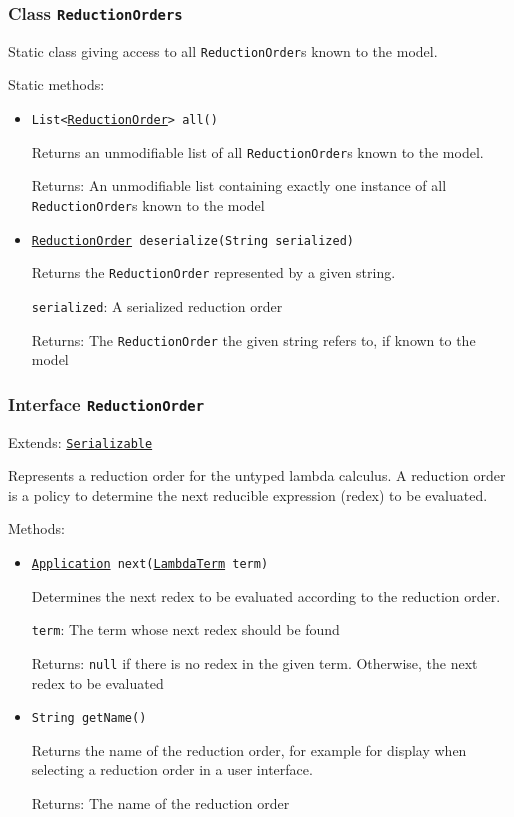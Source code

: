 \subsubsection{Class \texttt{ReductionOrders}}
\label{type:edu.kit.wavelength.client.model.reduction.ReductionOrders}
Static class giving access to all \texttt{ReductionOrder}s known to the model.

Static methods:
\begin{itemize}
\item \texttt{List<\hyperref[type:edu.kit.wavelength.client.model.reduction.ReductionOrder]{ReductionOrder}> all()}

Returns an unmodifiable list of all \texttt{ReductionOrder}s known to the
 model.

Returns: An unmodifiable list containing exactly one instance of all
         \texttt{ReductionOrder}s known to the model

\item \texttt{\hyperref[type:edu.kit.wavelength.client.model.reduction.ReductionOrder]{ReductionOrder} deserialize(String serialized)}

Returns the \texttt{ReductionOrder} represented by a given string.

\texttt{serialized}: A serialized reduction order

Returns: The \texttt{ReductionOrder} the given string refers to, if known to
         the model

\end{itemize}

\subsubsection{Interface \texttt{ReductionOrder}}
\label{type:edu.kit.wavelength.client.model.reduction.ReductionOrder}
Extends: \texttt{\hyperref[type:edu.kit.wavelength.client.model.serialization.Serializable]{Serializable}}

Represents a reduction order for the untyped lambda calculus. A reduction
 order is a policy to determine the next reducible expression (redex) to be evaluated.

Methods:
\begin{itemize}
\item \texttt{\hyperref[type:edu.kit.wavelength.client.model.term.Application]{Application} next(\hyperref[type:edu.kit.wavelength.client.model.term.LambdaTerm]{LambdaTerm} term)}

Determines the next redex to be evaluated according to the reduction order.

\texttt{term}: The term whose next redex should be found

Returns: \texttt{null} if there is no redex in the given term. Otherwise,
 the next redex to be evaluated

\item \texttt{String getName()}

Returns the name of the reduction order, for example for display when
 selecting a reduction order in a user interface.

Returns: The name of the reduction order

\end{itemize}


